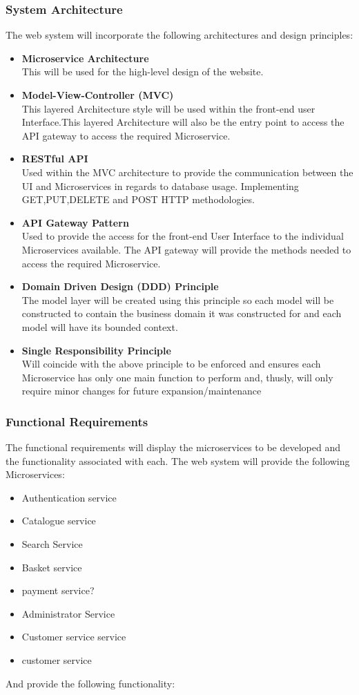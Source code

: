 \subsubsection{System Architecture}
The web system will incorporate the following architectures and design principles:
	\begin{itemize}\itemsep0pt
	\item \textbf{Microservice Architecture}
	\\This will be used for the high-level design of the website.
	\item \textbf{Model-View-Controller (MVC)}
	\\This layered Architecture style will be used within the front-end user Interface.This layered Architecture will also be the entry point to access the API gateway to access the required Microservice.
	\item \textbf{RESTful API}
	\\Used within the MVC architecture to provide the communication between the UI and Microservices in regards to database usage. Implementing GET,PUT,DELETE and POST HTTP methodologies.
	\item \textbf{API Gateway Pattern}
	\\Used to provide the access for the front-end User Interface to the individual Microservices available. The API gateway will provide the methods needed to access the required Microservice.
	\item \textbf{Domain Driven Design (DDD) Principle}
	\\ The model layer will be created using this principle so each model will be constructed to contain the business domain it was constructed for and each model will have its bounded context.
	\item \textbf{Single Responsibility Principle}
	\\ Will coincide with the above principle to be enforced and ensures each Microservice has only one main function to perform and, thusly, will only require minor changes for future expansion/maintenance
	\end{itemize}
\subsubsection{Functional Requirements}
The functional requirements will display the microservices to be developed and the functionality associated with each.
The web system will provide the following Microservices:
\begin{itemize}
	\item Authentication service
	\item Catalogue service
	\item Search Service
	\item Basket service
	\item payment service?
	\item Administrator Service
	\item Customer service service
	\item customer service
\end{itemize}
And provide the following functionality:
